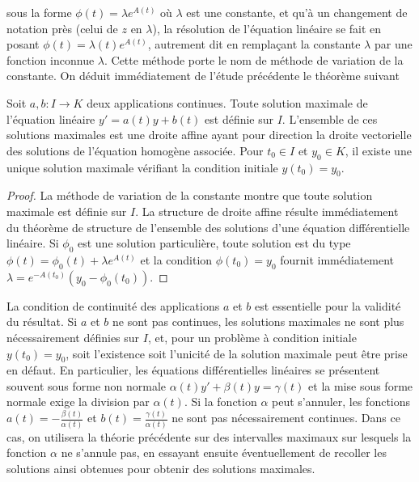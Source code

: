 sous la forme $\phi(t) = \lambda e^{A(t)}$ où $\lambda$ est une constante, et qu'à
un changement de notation près (celui de $z$ en $\lambda$), la résolution de
l'équation linéaire se fait en posant $\phi(t) = \lambda(t)e^{A(t)}$,
autrement dit en remplaçant la constante $\lambda$ par une
fonction inconnue $\lambda$. Cette méthode porte le nom de méthode de variation
de la constante. On déduit immédiatement de l'étude précédente le
théorème suivant
\begin{thm}
Soit $a,b : I \rightarrow K$ deux applications continues. Toute
solution maximale de l'équation linéaire $y' = a(t)y + b(t)$ est définie
sur $I$. L'ensemble de ces solutions maximales est une droite affine ayant
pour direction la droite vectorielle des solutions de l'équation
homogène associée. Pour $t_0 \in I$ et $y_0 \in K$, il existe
une unique solution maximale vérifiant la condition initiale
$y(t_0) = y_0$.
\end{thm}
\begin{proof}
La méthode de variation de la constante montre que toute
solution maximale est définie sur $I$. La structure de droite affine
résulte immédiatement du théorème de structure de l'ensemble des
solutions d'une équation différentielle linéaire. Si $\phi_0$ est
une solution particulière, toute solution est du type $\phi(t) =
\phi_0(t) + \lambda e^{A(t)}$ et la condition $\phi(t_0) =
y_0$ fournit immédiatement $\lambda = e^{-A(t_0)}(y_0 - \phi_0(t_0))$.
\end{proof}
\begin{rem}
La condition de continuité des applications $a$ et $b$ est
essentielle pour la validité du résultat. Si $a$ et $b$ ne sont pas
continues, les solutions maximales ne sont plus nécessairement définies
sur $I$, et, pour un problème à condition initiale $y(t_0) = y_0$, soit l'existence soit l'unicité de la solution maximale
peut être prise en défaut. En particulier, les équations différentielles
linéaires se présentent souvent sous forme non normale $\alpha(t)y' + \beta(t)y = \gamma(t)$ et la mise sous forme normale exige la division par $\alpha(t)$. Si la
fonction $\alpha$ peut s'annuler, les fonctions $a(t) = - \frac{\beta(t)}{\alpha(t)}$ et $b(t) = \frac{\gamma(t)}{\alpha(t)}$
ne sont pas nécessairement continues. Dans ce cas, on utilisera la
théorie précédente sur des intervalles maximaux sur lesquels la fonction
$\alpha$ ne s'annule pas, en essayant ensuite éventuellement de recoller les
solutions ainsi obtenues pour obtenir des solutions maximales.
\end{rem}

